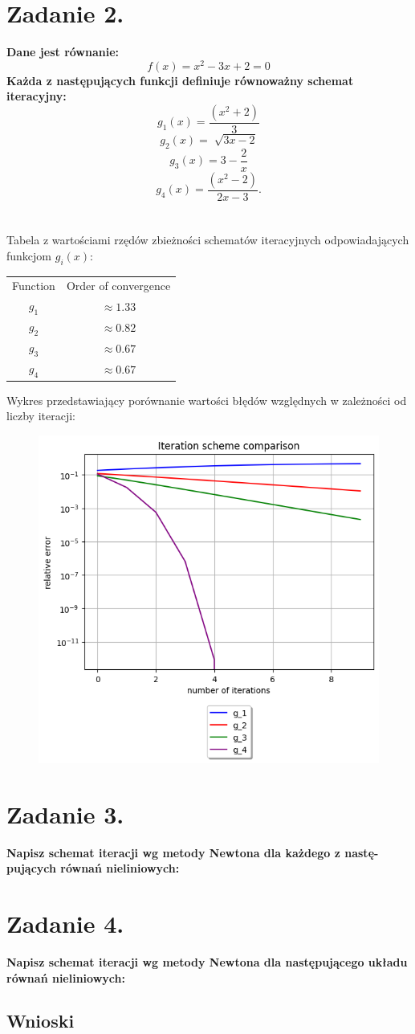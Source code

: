\documentclass{article}
\begin{document}
\section*{Zadanie 2.}
\textbf{Dane jest równanie: $$f(x)=x^2-3x+2=0$$
Każda z następujących funkcji definiuje równoważny schemat iteracyjny:
$$g_1(x)=\frac{(x^2+2)}{3}$$
$$g_2(x)=\sqrt[]{3x-2}$$
$$g_3(x)=3-\frac{2}{x}$$
$$g_4(x)=\frac{(x^2-2)}{2x-3}.$$
}
\\\\
Tabela z wartościami rzędów zbieżności schematów iteracyjnych 
odpowiadających funkcjom $g_i(x)$:
\begin{center}
  \begin{tabular}{c c} 
   Function & Order of convergence\\
   $g_1$ & $\approx 1.33$\\
   $g_2$ & $\approx 0.82$\\
   $g_3$ & $\approx 0.67$\\
   $g_4$ & $\approx 0.67$
  \end{tabular}
\end{center}
Wykres przedstawiający porównanie wartości błędów względnych w zależności od liczby
iteracji:
\begin{figure}[H]
  \includegraphics[width=\linewidth]{figures/iteration.png}
\end{figure}


\section*{Zadanie 3.}
\textbf{Napisz schemat iteracji wg metody Newtona dla każdego z nastę-
pujących równań nieliniowych:}

\section*{Zadanie 4.}
\textbf{Napisz schemat iteracji wg metody Newtona dla następującego
układu równań nieliniowych:}


\subsection*{Wnioski}
\null\quad 
\end{document}
